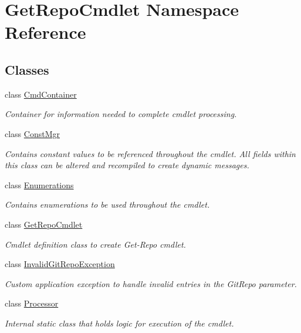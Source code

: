 \hypertarget{namespace_get_repo_cmdlet}{}\section{Get\+Repo\+Cmdlet Namespace Reference}
\label{namespace_get_repo_cmdlet}
\subsection*{Classes}
\begin{DoxyCompactItemize}
\item 
class \mbox{\hyperlink{class_get_repo_cmdlet_1_1_cmd_container}{Cmd\+Container}}
\begin{DoxyCompactList}\small\item\em Container for information needed to complete cmdlet processing. \end{DoxyCompactList}\item 
class \mbox{\hyperlink{class_get_repo_cmdlet_1_1_const_mgr}{Const\+Mgr}}
\begin{DoxyCompactList}\small\item\em Contains constant values to be referenced throughout the cmdlet. All fields within this class can be altered and recompiled to create dynamic messages. \end{DoxyCompactList}\item 
class \mbox{\hyperlink{class_get_repo_cmdlet_1_1_enumerations}{Enumerations}}
\begin{DoxyCompactList}\small\item\em Contains enumerations to be used throughout the cmdlet. \end{DoxyCompactList}\item 
class \mbox{\hyperlink{class_get_repo_cmdlet_1_1_get_repo_cmdlet}{Get\+Repo\+Cmdlet}}
\begin{DoxyCompactList}\small\item\em Cmdlet definition class to create Get-\/\+Repo cmdlet. \end{DoxyCompactList}\item 
class \mbox{\hyperlink{class_get_repo_cmdlet_1_1_invalid_git_repo_exception}{Invalid\+Git\+Repo\+Exception}}
\begin{DoxyCompactList}\small\item\em Custom application exception to handle invalid entries in the Git\+Repo parameter. \end{DoxyCompactList}\item 
class \mbox{\hyperlink{class_get_repo_cmdlet_1_1_processor}{Processor}}
\begin{DoxyCompactList}\small\item\em Internal static class that holds logic for execution of the cmdlet. \end{DoxyCompactList}\end{DoxyCompactItemize}
